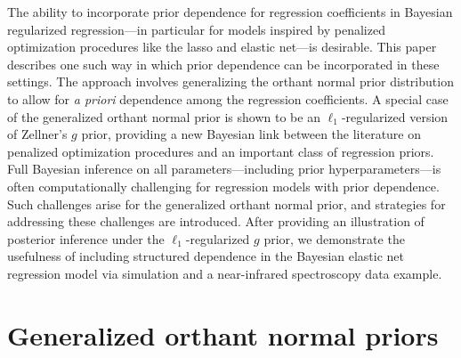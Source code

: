\documentclass[12pt]{article}
\begin{document}
The ability to incorporate prior dependence for regression
coefficients in Bayesian regularized regression---in particular for models inspired
by penalized optimization procedures like the lasso and elastic net---is desirable.
This paper describes one such way in which prior dependence can be incorporated
in these settings.  The approach involves generalizing the orthant normal prior distribution
\citep{hans:11} to allow for \emph{a priori} dependence among the regression coefficients.
A special case of the generalized orthant normal prior is shown to be an
$\ell_1$-regularized version of Zellner's $g$ prior, providing a new Bayesian link
between the literature on penalized optimization procedures and an important class
of regression priors.  Full Bayesian inference on all parameters---including prior
hyperparameters---is often computationally challenging for regression models with
prior dependence.  Such challenges arise for the generalized orthant normal prior,
and strategies for addressing these challenges are introduced. After providing an
illustration of posterior inference under the $\ell_1$-regularized $g$ prior, we
demonstrate the usefulness of including structured dependence in the Bayesian elastic 
net regression model via simulation and a near-infrared spectroscopy data example.

\section{Generalized orthant normal priors}\label{sec:genop}
\end{document}
